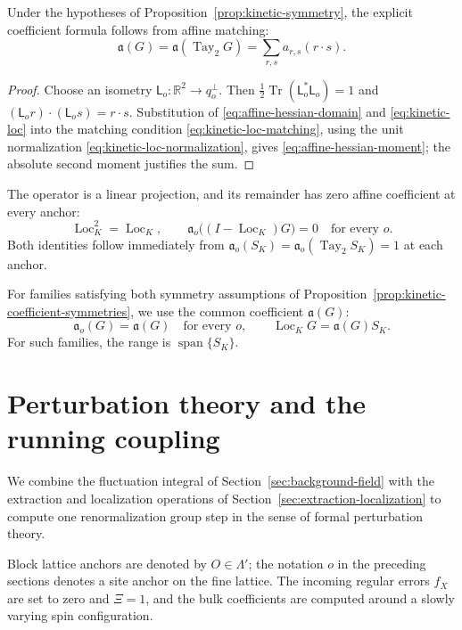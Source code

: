 \documentclass[11pt]{article}
\newcommand{\R}{\mathbb R}
\newcommand{\Id}{I}
\newcommand{\tr}{\operatorname{Tr}}
\newcommand{\Tay}{\operatorname{Tay}}
\newcommand{\Loc}{\operatorname{Loc}}
\numberwithin{equation}{section}
\theoremstyle{definition}
\theoremstyle{plain}
\begin{document}
Under the hypotheses of Proposition~\ref{prop:kinetic-symmetry},
the explicit coefficient formula follows from affine matching:
\begin{equation}
 \mathfrak a(G)=\mathfrak a(\Tay_2 G)
              =\sum_{r,s}a_{r,s}(r\cdot s).
 \label{eq:affine-hessian-moment}
\end{equation}
\begin{proof}
Choose an isometry $\mathsf L_o:\R^2\to q_o^\perp$.
Then $\tfrac12\tr(\mathsf L_o^*\mathsf L_o)=1$ and
$(\mathsf L_o r)\cdot(\mathsf L_o s)=r\cdot s$.
Substitution of \eqref{eq:affine-hessian-domain} and
\eqref{eq:kinetic-loc} into the matching condition
\eqref{eq:kinetic-loc-matching}, using the unit normalization
\eqref{eq:kinetic-loc-normalization}, gives
\eqref{eq:affine-hessian-moment}; the absolute second moment
justifies the sum.
\end{proof}

The operator is a linear projection, and its remainder has zero
affine coefficient at every anchor:
\begin{equation}
 \Loc_{K}^2=\Loc_{K},\qquad
 \mathfrak a_o\bigl((\Id-\Loc_K)G\bigr)=0
 \quad\text{for every }o.
 \label{eq:kinetic-loc-projection}
\end{equation}
Both identities follow immediately from
$\mathfrak a_o(S_K)=\mathfrak a_o(\Tay_2 S_K)=1$ at each anchor.

For families satisfying both symmetry assumptions of
Proposition~\ref{prop:kinetic-coefficient-symmetries}, we use
the common coefficient $\mathfrak a(G)$:
\begin{equation}
 \mathfrak a_o(G)=\mathfrak a(G)\quad\text{for every }o,
 \qquad
 \Loc_K G=\mathfrak a(G)S_K.
 \label{eq:kinetic-loc-translation}
\end{equation}
For such families, the range is $\operatorname{span}\{S_K\}$.

\newpage
\section{Perturbation theory and the running coupling}
\label{sec:perturbative-coupling}

We combine the fluctuation integral of
Section~\ref{sec:background-field} with the extraction and
localization operations of Section~\ref{sec:extraction-localization}
to compute one renormalization group step in the sense of formal perturbation theory.

Block lattice anchors are denoted by $O\in\Lambda'$; the notation $o$ in the preceding
sections denotes a site anchor on the fine lattice.
The incoming regular errors $f_X$ are set to zero and $\Xi=1$,
and the bulk coefficients are computed around a slowly varying spin configuration.
\end{document}
